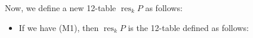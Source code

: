 \documentclass[numbers=enddot,12pt,final,onecolumn,notitlepage]{scrartcl}%
\theoremstyle{definition}
\begin{document}
Now, we define a new 12-table $\operatorname*{res}\nolimits_{k}P$ as follows:

\begin{itemize}
\item If we have (M1), then $\operatorname*{res}_{k}P$ is the
12-table defined as follows:

\end{itemize}
\end{document}

